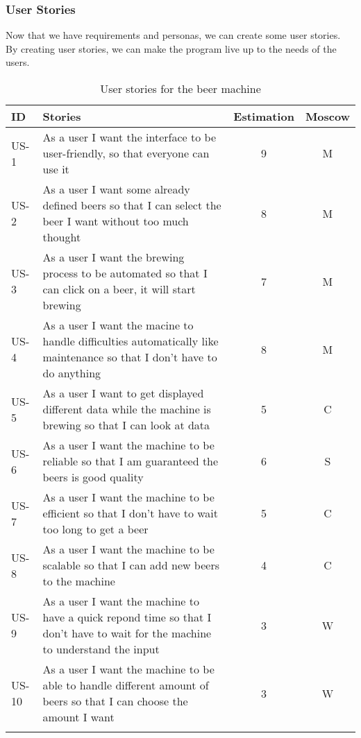 \subsubsection{User Stories}

Now that we have requirements and personas, we can create some user stories. By creating user stories, we can make the program live up to the needs of the users.

\begin{table}[H]
    \begin{center}
        \sloppy
        \begin{longtable}{|p{1cm}|p{11cm}|c|c|}
            \hline
            ID    & Stories                                                                                                                       & Estimation & Moscow \\ \hline
            US-1  & As a user I want the interface to be user-friendly, so that everyone can use it                                               & 9          & M      \\ \hline
            US-2  & As a user I want some already defined beers  so that I can select the beer I want without too much thought                    & 8          & M      \\ \hline
            US-3  & As a user I want the brewing process to be automated so that I can click on a beer, it will start brewing                     & 7          & M      \\ \hline
            US-4  & As a user I want the macine to handle difficulties automatically like maintenance so that I don't have to do anything         & 8          & M      \\ \hline
            US-5  & As a user I want to get displayed different data while the machine is brewing so that I can look at data                      & 5          & C      \\ \hline
            US-6  & As a user I want the machine to be reliable so that I am guaranteed the beers is good quality                                 & 6          & S      \\ \hline
            US-7  & As a user I want the machine to be efficient so that I don't have to wait too long to get a beer                              & 5          & C      \\ \hline
            US-8  & As a user I want the machine to be scalable so that I can add new beers to the machine                                        & 4          & C      \\ \hline
            US-9  & As a user I want the machine to have a quick repond time so that I don't have to wait for the machine to understand the input & 3          & W      \\ \hline
            US-10 & As a user I want the machine to be able to handle different amount of beers so that I can choose the amount I want            & 3          & W      \\ \hline

            \caption{User stories for the beer machine}
            \label{tab:user_stories}
        \end{longtable}
    \end{center}
\end{table}